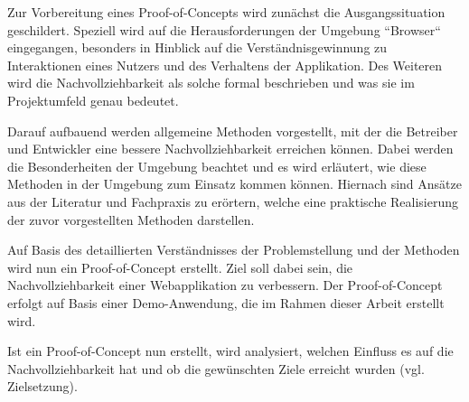 Zur Vorbereitung eines Proof-of-Concepts wird zunächst die Ausgangssituation geschildert. Speziell wird auf die Herausforderungen der Umgebung ``Browser`` eingegangen, besonders in Hinblick auf die Verständnisgewinnung zu Interaktionen eines Nutzers und des Verhaltens der Applikation. Des Weiteren wird die Nachvollziehbarkeit als solche formal beschrieben und was sie im Projektumfeld genau bedeutet.



Darauf aufbauend werden allgemeine Methoden vorgestellt, mit der die Betreiber und Entwickler eine bessere Nachvollziehbarkeit erreichen können. Dabei werden die Besonderheiten der Umgebung beachtet und es wird erläutert, wie diese Methoden in der Umgebung zum Einsatz kommen können. Hiernach sind Ansätze aus der Literatur und Fachpraxis zu erörtern, welche eine praktische Realisierung der zuvor vorgestellten Methoden darstellen.


Auf Basis des detaillierten Verständnisses der Problemstellung und der Methoden wird nun ein Proof-of-Concept erstellt. Ziel soll dabei sein, die Nachvollziehbarkeit einer Webapplikation zu verbessern. Der Proof-of-Concept erfolgt auf Basis einer Demo-Anwendung, die im Rahmen dieser Arbeit erstellt wird.

Ist ein Proof-of-Concept nun erstellt, wird analysiert, welchen Einfluss es auf die Nachvollziehbarkeit hat und ob die gewünschten Ziele erreicht wurden (vgl. Zielsetzung).


